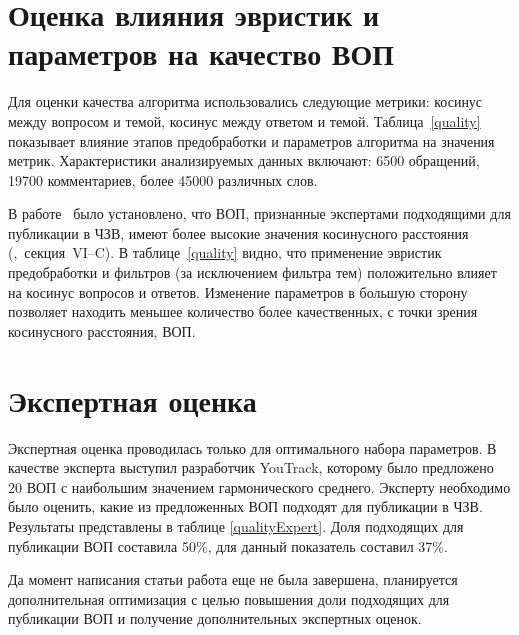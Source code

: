 \section{Оценка влияния эвристик и параметров на качество ВОП}

Для оценки качества алгоритма использовались следующие метрики: косинус между вопросом и темой, косинус между ответом и темой. Таблица~\ref{quality} показывает влияние этапов предобработки и параметров алгоритма на значения метрик. Характеристики анализируемых данных включают: 6500 обращений, 19700 комментариев, более 45000 различных слов.

В работе~\cite{original} было установлено, что ВОП, признанные экспертами подходящими для публикации в ЧЗВ, имеют более высокие значения косинусного расстояния (\cite{original},~секция~VI--C). В таблице~\ref{quality} видно, что применение эвристик предобработки и фильтров (за исключением фильтра тем) положительно влияет на косинус вопросов и ответов. Изменение параметров в большую сторону позволяет находить меньшее количество более качественных, с точки зрения косинусного расстояния, ВОП.

\section{Экспертная оценка}

Экспертная оценка проводилась только для оптимального набора параметров. В качестве эксперта выступил разработчик YouTrack, которому было предложено 20 ВОП с наибольшим значением гармонического среднего. Эксперту необходимо было оценить, какие из предложенных ВОП подходят для публикации в ЧЗВ. Результаты представлены в таблице \ref{qualityExpert}. Доля подходящих для публикации ВОП составила 50\%, для \cite{original} данный показатель составил 37\%. 

Да момент написания статьи работа еще не была завершена, планируется дополнительная оптимизация с целью повышения доли подходящих для публикации ВОП и получение дополнительных экспертных оценок. 

